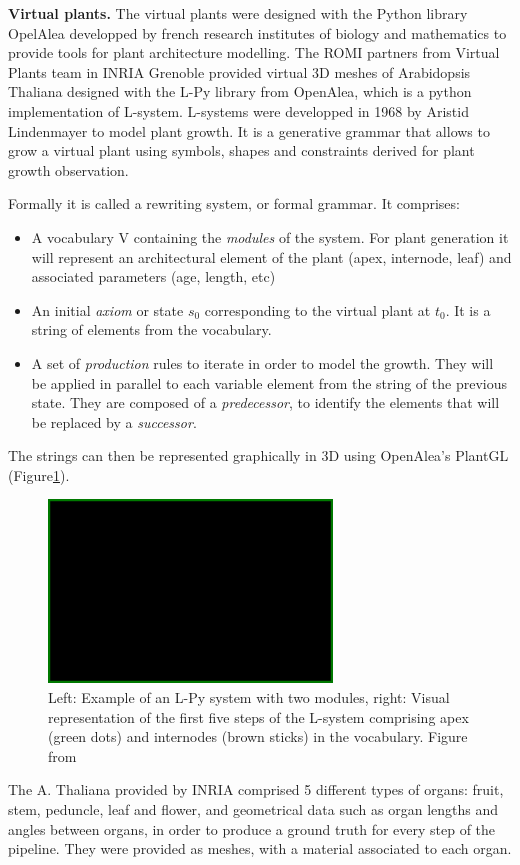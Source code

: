 
\textbf{Virtual plants.} The virtual plants were designed with the Python library OpelAlea developped by french research institutes of biology and mathematics to provide tools for plant architecture modelling. The ROMI partners from Virtual Plants team in INRIA Grenoble provided virtual 3D meshes of Arabidopsis Thaliana designed with the L-Py library from OpenAlea, which is a python implementation of L-system. L-systems were developped in 1968 by Aristid Lindenmayer \cite{} to model plant growth. It is a generative grammar that allows to grow a virtual plant using symbols, shapes and constraints derived for plant growth observation. 

Formally it is called a rewriting system, or formal grammar. It comprises: 

\begin{itemize}
    \item A vocabulary V containing the \textit{modules} of the system. For plant generation it will represent an architectural element of the plant (apex, internode, leaf) and associated parameters (age, length, etc)
    \item An initial \textit{axiom} or state $s_0$ corresponding to the virtual plant at $t_0$. It is a string of elements from the vocabulary.
    \item A set of \textit{production} rules to iterate in order to model the growth. They will be applied in parallel to each variable element from the string of the previous state. They are composed of a \textit{predecessor}, to identify the elements that will be replaced by a \textit{successor}.
\end{itemize}

The strings can then be represented graphically in 3D using OpenAlea's PlantGL (Figure\ref{fig:lpy}).\\

\begin{figure}[h!]
    \centering
    \includegraphics[width = 0.1\linewidth]{figures/blank.png}
    \caption{Left: Example of an L-Py system with two modules, right: Visual representation of the first five steps of the L-system comprising apex (green dots) and internodes (brown sticks) in the vocabulary. Figure from \cite{boudon_l-py:_2012}}
    \label{fig:lpy}
\end{figure}

The A. Thaliana provided by INRIA comprised 5 different types of organs: fruit, stem, peduncle, leaf and flower, and geometrical data such as organ lengths and angles between organs, in order to produce a ground truth for every step of the pipeline. They were provided as meshes, with a material associated to each organ.\\

